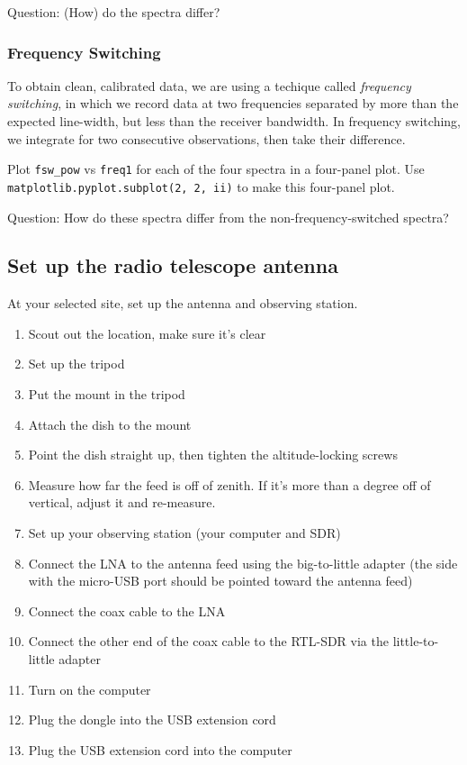\documentclass[11pt]{article}
\begin{document}
Question: (How) do the spectra differ?

\subsubsection{Frequency Switching}
\label{sec:fsw}
To obtain clean, calibrated data, we are using a techique called \emph{frequency switching},
in which we record data at two frequencies separated by more than the expected line-width,
but less than the receiver bandwidth.  In frequency switching, we integrate for two consecutive
observations, then take their difference.

Plot \verb|fsw_pow| vs \verb|freq1| for each of the four spectra in a four-panel plot.
Use \verb|matplotlib.pyplot.subplot(2, 2, ii)| to make this four-panel plot.

Question: How do these spectra differ from the non-frequency-switched spectra?


\subsection{Set up the radio telescope antenna}
At your selected site, set up the antenna and observing station.

\begin{enumerate}
    \item Scout out the location, make sure it's clear
    \item Set up the tripod
    \item Put the mount in the tripod
    \item Attach the dish to the mount
    \item Point the dish straight up, then tighten the altitude-locking screws
    \item Measure how far the feed is off of zenith.  If it's more than a degree off of vertical, adjust it and re-measure.
    \item Set up your observing station (your computer and SDR)
    \item Connect the LNA to the antenna feed using the big-to-little adapter
        (the side with the micro-USB port should be pointed toward the antenna
        feed)
    \item Connect the coax cable to the LNA
    \item Connect the other end of the coax cable to the RTL-SDR via the little-to-little adapter
    \item Turn on the computer
    \item Plug the dongle into the USB extension cord
    \item Plug the USB extension cord into the computer
\end{enumerate}
\end{document}
